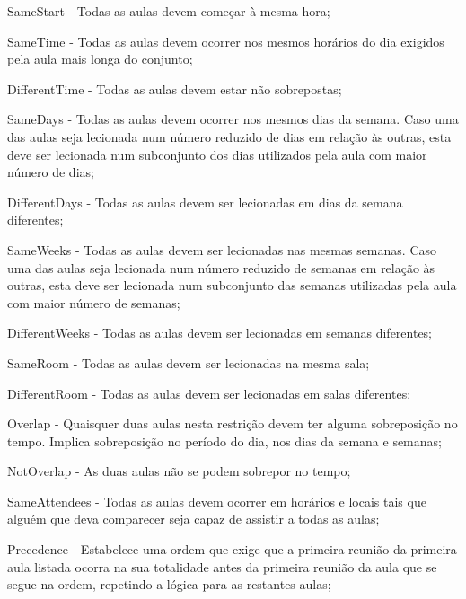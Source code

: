 \begin{compactitem}
    \item SameStart - Todas as aulas devem começar à mesma hora;

    \item SameTime - Todas as aulas devem ocorrer nos mesmos horários do dia exigidos pela aula mais longa do conjunto;

    \item DifferentTime - Todas as aulas devem estar não sobrepostas;

    \item SameDays - Todas as aulas devem ocorrer nos mesmos dias da semana. Caso uma das aulas seja lecionada num número reduzido de dias em relação às outras, esta deve ser lecionada num subconjunto dos dias utilizados pela aula com maior número de dias;

    \item DifferentDays - Todas as aulas devem ser lecionadas em dias da semana diferentes;

    \item SameWeeks - Todas as aulas devem ser lecionadas nas mesmas semanas. Caso uma das aulas seja lecionada num número reduzido de semanas em relação às outras, esta deve ser lecionada num subconjunto das semanas utilizadas pela aula com maior número de semanas;

    \item DifferentWeeks - Todas as aulas devem ser lecionadas em semanas diferentes;

    \item SameRoom - Todas as aulas devem ser lecionadas na mesma sala;

    \item DifferentRoom - Todas as aulas devem ser lecionadas em salas diferentes;

    \item Overlap - Quaisquer duas aulas nesta restrição devem ter alguma sobreposição no tempo. Implica sobreposição no período do dia, nos dias da semana e semanas;

    \item NotOverlap - As duas aulas não se podem sobrepor no tempo;

    \item SameAttendees - Todas as aulas devem ocorrer em horários e locais tais que alguém que deva comparecer seja capaz de assistir a todas as aulas;

    \item Precedence - Estabelece uma ordem que exige que a primeira reunião da primeira aula listada ocorra na sua totalidade antes da primeira reunião da aula que se segue na ordem, repetindo a lógica para as restantes aulas;


\end{compactitem}
